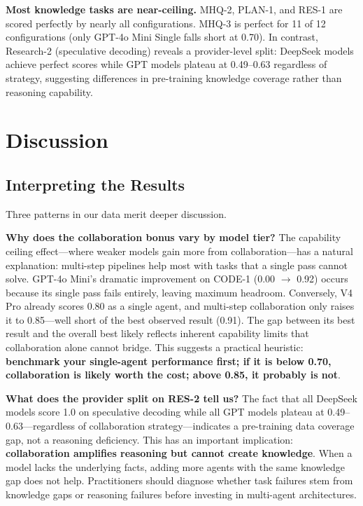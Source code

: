 \documentclass[sigconf,nonacm]{acmart}
\begin{document}
\textbf{Most knowledge tasks are near-ceiling.} MHQ-2, PLAN-1, and RES-1 are scored perfectly by nearly all configurations. MHQ-3 is perfect for 11 of 12 configurations (only GPT-4o Mini Single falls short at 0.70). In contrast, Research-2 (speculative decoding) reveals a provider-level split: DeepSeek models achieve perfect scores while GPT models plateau at 0.49--0.63 regardless of strategy, suggesting differences in pre-training knowledge coverage rather than reasoning capability.


\section{Discussion}

\subsection{Interpreting the Results}

Three patterns in our data merit deeper discussion.

\textbf{Why does the collaboration bonus vary by model tier?} The capability ceiling effect—where weaker models gain more from collaboration—has a natural explanation: multi-step pipelines help most with tasks that a single pass cannot solve. GPT-4o Mini's dramatic improvement on CODE-1 (0.00 $\rightarrow$ 0.92) occurs because its single pass fails entirely, leaving maximum headroom. Conversely, V4 Pro already scores 0.80 as a single agent, and multi-step collaboration only raises it to 0.85—well short of the best observed result (0.91). The gap between its best result and the overall best likely reflects inherent capability limits that collaboration alone cannot bridge. This suggests a practical heuristic: \textbf{benchmark your single-agent performance first; if it is below 0.70, collaboration is likely worth the cost; above 0.85, it probably is not}.

\textbf{What does the provider split on RES-2 tell us?} The fact that all DeepSeek models score 1.0 on speculative decoding while all GPT models plateau at 0.49--0.63—regardless of collaboration strategy—indicates a pre-training data coverage gap, not a reasoning deficiency. This has an important implication: \textbf{collaboration amplifies reasoning but cannot create knowledge}. When a model lacks the underlying facts, adding more agents with the same knowledge gap does not help. Practitioners should diagnose whether task failures stem from knowledge gaps or reasoning failures before investing in multi-agent architectures.
\end{document}
